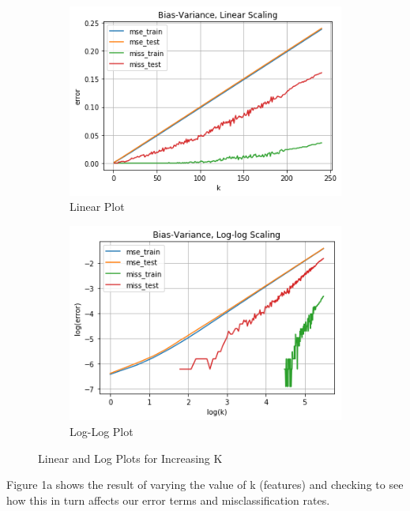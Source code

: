 \documentclass[a4paper]{article}
\begin{document}
\begin{figure}[h!]
  \centering
  \begin{subfigure}[b]{0.87\linewidth}
    \includegraphics[width=\linewidth]{./1.png}
    \caption{Linear Plot}
  \end{subfigure}
  \begin{subfigure}[b]{0.87\linewidth}
    \includegraphics[width=\linewidth]{./2.png}
    \caption{Log-Log Plot}
  \end{subfigure}
  \caption{Linear and Log Plots for Increasing K }
  \label{fig:plots}
\end{figure}

Figure 1a shows the result of varying the value of k (features) and checking to see how this in turn affects our error terms and misclassification rates. \\
\end{document}
